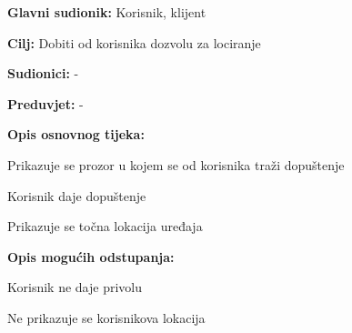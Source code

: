 					\noindent {}
					\begin{packed_item}
	
						\item \textbf{Glavni sudionik: }Korisnik, klijent
						\item  \textbf{Cilj:} Dobiti od korisnika dozvolu za lociranje
						\item  \textbf{Sudionici:} -
						\item  \textbf{Preduvjet:} -
						\item  \textbf{Opis osnovnog tijeka:}
						
						\item[] \begin{packed_enum}
	
							\item Prikazuje se prozor u kojem se od korisnika traži dopuštenje
							\item Korisnik daje dopuštenje
							\item Prikazuje se točna lokacija uređaja

						\end{packed_enum}
						
						\item  \textbf{Opis mogućih odstupanja:}
						
						\item[] \begin{packed_item}
	
							\item[2.a] Korisnik ne daje privolu
							\item[] \begin{packed_enum}
								
								\item Ne prikazuje se korisnikova lokacija
								
							\end{packed_enum}
							
						\end{packed_item}
						
					\end{packed_item}
					
